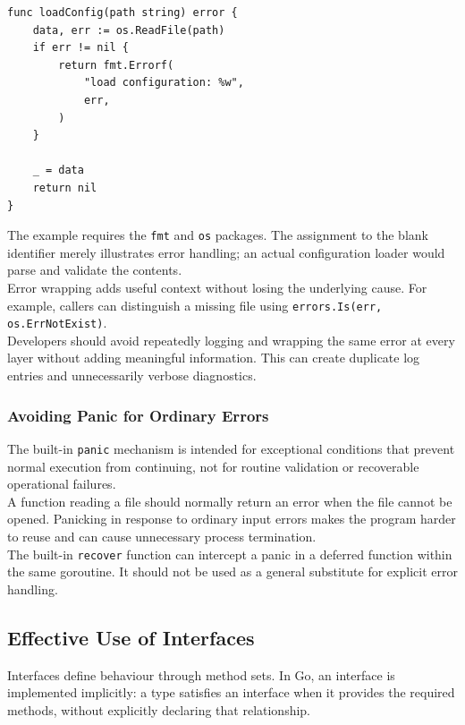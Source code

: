\begin{lstlisting}
func loadConfig(path string) error {
    data, err := os.ReadFile(path)
    if err != nil {
        return fmt.Errorf(
            "load configuration: %w",
            err,
        )
    }

    _ = data
    return nil
}
\end{lstlisting}

The example requires the \texttt{fmt} and \texttt{os} packages. The assignment to the blank identifier merely illustrates error handling; an actual configuration loader would parse and validate the contents.\\

Error wrapping adds useful context without losing the underlying cause. For example, callers can distinguish a missing file using \texttt{errors.Is(err, os.ErrNotExist)}.\\

Developers should avoid repeatedly logging and wrapping the same error at every layer without adding meaningful information. This can create duplicate log entries and unnecessarily verbose diagnostics.

\subsubsection{Avoiding Panic for Ordinary Errors}

The built-in \texttt{panic} mechanism is intended for exceptional conditions that prevent normal execution from continuing, not for routine validation or recoverable operational failures.\\

A function reading a file should normally return an error when the file cannot be opened. Panicking in response to ordinary input errors makes the program harder to reuse and can cause unnecessary process termination.\\

The built-in \texttt{recover} function can intercept a panic in a deferred function within the same goroutine. It should not be used as a general substitute for explicit error handling.\\

\subsection{Effective Use of Interfaces}

Interfaces define behaviour through method sets. In Go, an interface is implemented implicitly: a type satisfies an interface when it provides the required methods, without explicitly declaring that relationship.\\

